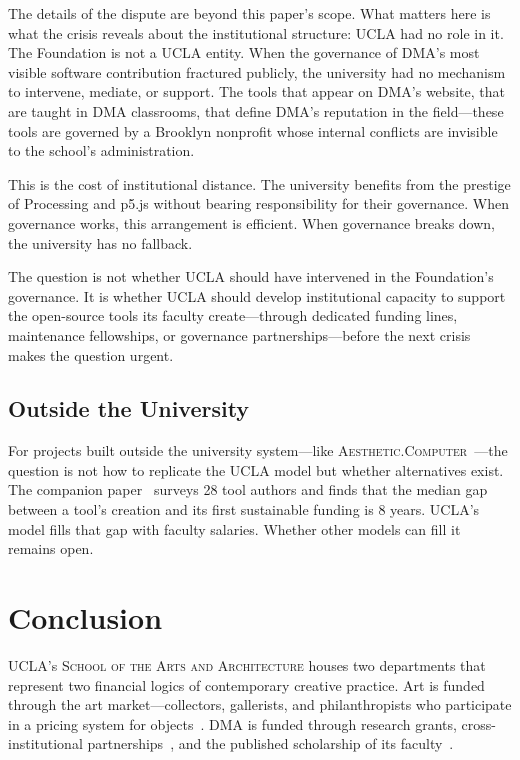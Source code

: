 \documentclass[10pt,letterpaper,twocolumn]{article}
\newcommand{\ac}{\textsc{Aesthetic.Computer}}
\newcommand{\dma}{\textsc{DMA}}
\newcommand{\sofa}{\textsc{School of the Arts and Architecture}}
\begin{document}
The details of the dispute are beyond this paper's scope. What matters here is what the crisis reveals about the institutional structure: UCLA had no role in it. The Foundation is not a UCLA entity. When the governance of \dma{}'s most visible software contribution fractured publicly, the university had no mechanism to intervene, mediate, or support. The tools that appear on \dma{}'s website, that are taught in \dma{} classrooms, that define \dma{}'s reputation in the field---these tools are governed by a Brooklyn nonprofit whose internal conflicts are invisible to the school's administration.

This is the cost of institutional distance. The university benefits from the prestige of Processing and p5.js without bearing responsibility for their governance. When governance works, this arrangement is efficient. When governance breaks down, the university has no fallback.

The question is not whether UCLA should have intervened in the Foundation's governance. It is whether UCLA should develop institutional capacity to support the open-source tools its faculty create---through dedicated funding lines, maintenance fellowships, or governance partnerships---before the next crisis makes the question urgent.

\subsection{Outside the University}

For projects built outside the university system---like \ac{}~\citep{scudder2026ac, scudder2026os, scudder2026kidlisp}---the question is not how to replicate the UCLA model but whether alternatives exist. The companion paper~\citep{scudder2026sustainability} surveys 28 tool authors and finds that the median gap between a tool's creation and its first sustainable funding is 8 years. UCLA's model fills that gap with faculty salaries. Whether other models can fill it remains open.

\section{Conclusion}

UCLA's \sofa{} houses two departments that represent two financial logics of contemporary creative practice. Art is funded through the art market---collectors, gallerists, and philanthropists who participate in a pricing system for objects~\citep{leavin2016gift, resnickchair2019}. \dma{} is funded through research grants, cross-institutional partnerships~\citep{dmahistory}, and the published scholarship of its faculty~\citep{reas2006processing, vesna2007database, stern2002medieval, lunenfeld2011secretwar}.
\end{document}
